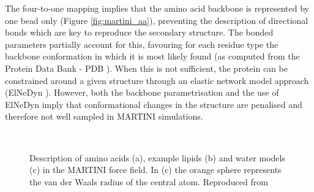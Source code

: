 The four-to-one mapping implies that the amino acid backbone is represented by one bead only (Figure \ref{fig:martini_aa}), preventing the description of directional bonds which are key to reproduce the secondary structure. The bonded parameters partially account for this, favouring for each residue type the backbone conformation in which it is most likely found (as computed from the Protein Data Bank - PDB \citep{PDB}). When this is not sufficient, the protein can be constrained around a given structure through an elastic network model approach (ElNeDyn \citep{Periole2009}). However, both the backbone parametrisation and the use of ElNeDyn imply that conformational changes in the structure are penalised and therefore not well sampled in MARTINI simulations.
%
\begin{figure}[t!]
\centering
{} \\
%
\caption[MARTINI force field mapping for amino acids, lipids and water]{Description of amino acids (a), example lipids (b) and water models (c) in the MARTINI force field. In (c) the orange sphere represents the van der Waals radius of the central atom. Reproduced from \citet{Monticelli2008,calgary_site,Yesylevskyy2010}}
\label{fig:martini}
\end{figure}


